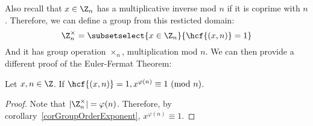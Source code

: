 \documentclass[../Main.tex]{subfiles}
\begin{document}
Also recall that $x \in \Z_n$ has a multiplicative inverse mod $n$ if it is coprime with $n$. Therefore, we can define a group from this resticted domain:
\begin{equation*}
    \Z_n^{\times} = \subsetselect{x \in \Z_n}{\hcf{(x, n)} = 1}
\end{equation*}
And it has group operation $\times_n$, multiplication mod $n$.
We can then provide a different proof of the Euler-Fermat Theorem:
\begin{theorem}
    Let $x, n \in \Z$. If $\hcf{(x, n)} = 1, x^{\varphi(n)} \equiv 1~(\text{mod }n)$.
\end{theorem}
\begin{proof}
    Note that $|\Z_n^{\times}| = \varphi(n)$. Therefore, by corollary~\ref{corGroupOrderExponent}, $x^{\varphi(n)} \equiv 1$.
\end{proof}
\end{document}
